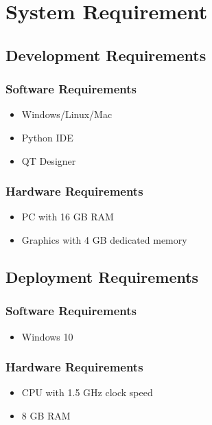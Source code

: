 \section{System Requirement}
\vspace{-18pt}
\subsection{Development Requirements}
\vspace{-18pt}
\subsubsection{Software Requirements}
\vspace{-10pt}
\begin{itemize}
\item Windows/Linux/Mac
\item Python IDE
\item QT Designer
\end{itemize}
\subsubsection{Hardware Requirements}
\vspace{-10pt}
\begin{itemize}
\item PC with 16 GB RAM
\item Graphics with 4 GB dedicated memory
\end{itemize}
\subsection{Deployment Requirements}
\vspace{-18pt}
\subsubsection{Software Requirements}
\vspace{-10pt}
\begin{itemize}
\item Windows 10


\end{itemize}
\vspace{-10pt}
\subsubsection{Hardware Requirements}
\vspace{-10pt}
\begin{itemize}
\item CPU with 1.5 GHz clock speed
\item 8 GB RAM
\end{itemize}
\label{tblSampleTable}
